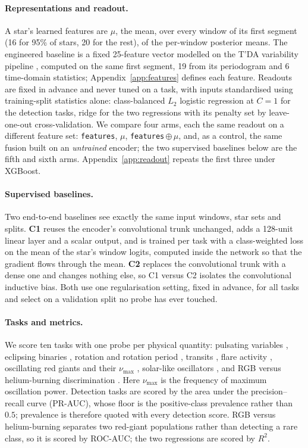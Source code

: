 \documentclass{article}
\begin{document}
\paragraph{Representations and readout.} A star's learned features are $\mu$, the mean, over every
window of its first segment (16 for 95\% of stars, 20 for the rest), of the per-window posterior
means. The engineered baseline is a fixed 25-feature vector modelled on the T'DA variability pipeline
\citep{audenaert2021}, computed on the same first segment, 19 from its periodogram and 6 time-domain statistics; Appendix~\ref{app:features} defines each feature. Readouts are fixed in advance and never
tuned on a task, with inputs standardised using training-split statistics alone: class-balanced $L_{2}$ logistic regression
at $C = 1$ for the detection tasks, ridge for the two regressions with its penalty set by leave-one-out
cross-validation. We compare four
arms, each the same readout on a different feature set: \texttt{features}, $\mu$,
\texttt{features}\,$\oplus\,\mu$, and, as a control, the same fusion built on an \emph{untrained}
encoder; the two supervised baselines below are the fifth and sixth arms.
Appendix~\ref{app:readout} repeats the first three under XGBoost.

\paragraph{Supervised baselines.} Two end-to-end baselines see exactly the same input windows, star
sets and splits. \textbf{C1} reuses the encoder's convolutional trunk unchanged, adds a 128-unit linear layer
and a scalar output, and is trained per task with a class-weighted loss on the mean of the star's window logits, computed
inside the network so that the gradient flows through the mean. \textbf{C2} replaces the convolutional trunk with a
dense one and changes nothing else, so C1 versus C2 isolates the convolutional inductive bias. Both
use one regularisation setting, fixed in advance, for all tasks and select on a validation split no
probe has ever touched.

\paragraph{Tasks and metrics.} We score ten tasks with one probe per physical quantity: pulsating
variables \citep{gao2025}, eclipsing binaries \citep{prsa2022}, rotation and rotation period
\citep{boyle2026}, transits \citep{guerrero2021}, flare activity \citep{seli2025,vida2021},
oscillating red giants and their $\nu_{\max}$ \citep{hon2021}, solar-like oscillators
\citep{hatt2023}, and RGB versus helium-burning discrimination \citep{sreenivas2026}. Here
$\nu_{\max}$ is the frequency of maximum oscillation power. Detection tasks are scored by the area
under the precision--recall curve (PR-AUC), whose floor is the positive-class prevalence rather than
$0.5$; prevalence is therefore quoted with every detection score. RGB versus helium-burning
separates two red-giant populations rather than detecting a rare class, so it is scored by ROC-AUC;
the two regressions are scored by $R^{2}$.
\end{document}

